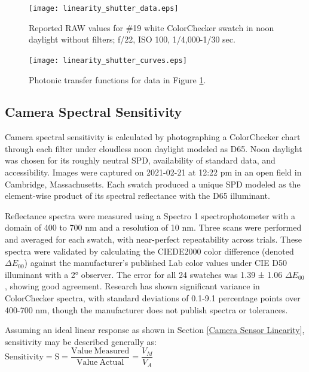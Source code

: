 \documentclass[twocolumn,10pt]{asme2ej}
\newcommand{\id}{\hspace{6 mm}}
\begin{document}
\begin{figure}
\centering
\texttt{[image: linearity\_shutter\_data.eps]}
\caption{Reported RAW values for \#19 white ColorChecker swatch in noon daylight without filters; f/22, ISO 100, 1/4,000-1/30 sec.}
\label{linearity_shutter_data}
\end{figure}

\begin{figure}
\centering
\texttt{[image: linearity\_shutter\_curves.eps]}
\caption{Photonic transfer functions for data in Figure \ref{linearity_shutter_data}.}
\label{linearity_shutter_curves}
\end{figure}

\subsection{Camera Spectral Sensitivity}
\label{Camera_Spectral_Sensitivity}

Camera spectral sensitivity is calculated by photographing a ColorChecker chart through each filter under cloudless noon daylight modeled as D65. Noon daylight was chosen for its roughly neutral SPD, availability of standard data, and accessibility. Images were captured on 2021-02-21 at 12:22 pm in an open field in Cambridge, Massachusetts. Each swatch produced a unique SPD modeled as the element-wise product of its spectral reflectance with the D65 illuminant. \cite{CVRL}

\id Reflectance spectra were measured using a Spectro 1 spectrophotometer with a domain of 400 to 700 nm and a resolution of 10 nm. Three scans were performed and averaged for each swatch, with near-perfect repeatability across trials. These spectra were validated by calculating the CIEDE2000 color difference (denoted $\Delta E_{00}$) against the manufacturer's published Lab color values under CIE D50 illuminant with a 2° observer. \cite{X-Rite} The error for all 24 swatches was 1.39 ± 1.06 $\Delta E_{00}$, showing good agreement. Research has shown significant variance in ColorChecker spectra, with standard deviations of 0.1-9.1 percentage points over 400-700 nm, though the manufacturer does not publish spectra or tolerances. \cite{BabelColor}

\id Assuming an ideal linear response as shown in Section \ref{Camera Sensor Linearity}, sensitivity may be described generally as:\\

$\mathrm{ Sensitivity = S = \dfrac{Value \ Measured}{Value \ Actual} } = \dfrac{V_M}{V_A}$ \\
\end{document}
